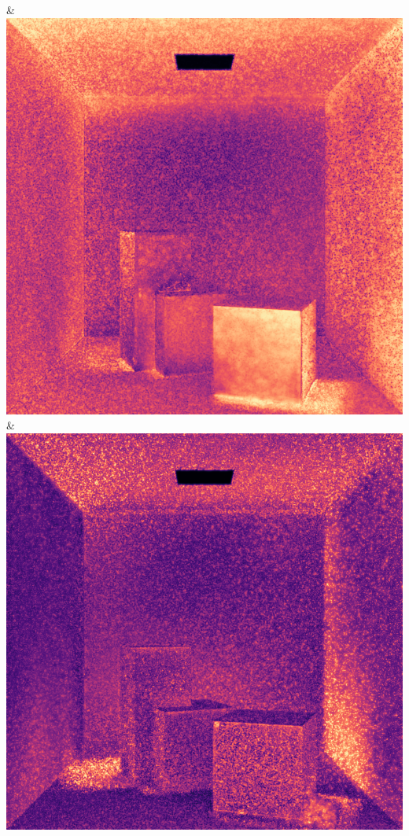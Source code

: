 & \includegraphics[width=\linewidth]{figures/py/tests/quality_comparison/nrc+lt_1spp_flip.png}
& \includegraphics[width=\linewidth]{figures/py/tests/quality_comparison/nrc+sppc_1spp_flip.png}
